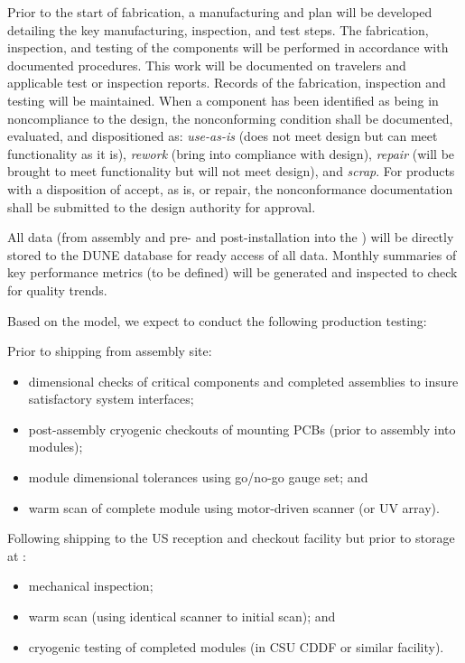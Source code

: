 
Prior to the start of fabrication, a manufacturing and  plan will be developed detailing the key manufacturing, inspection, and test steps.  The fabrication, inspection, and testing of the components will be performed in accordance with documented procedures. This work will be documented on travelers and applicable test or inspection reports. Records of the fabrication, inspection and testing will be maintained. When a component has been identified as being in noncompliance to the design, the nonconforming condition shall be documented, evaluated, and dispositioned as: {\it use-as-is} (does not meet design but can meet functionality as it is), {\it rework} (bring into compliance with design), {\it repair} (will be brought to meet functionality but will not meet design), and {\it scrap}. For products with a disposition of accept, as is, or repair, the nonconformance documentation shall be submitted to the design authority for approval.   

All  data  (from assembly and pre- and post-installation into the ) will be directly stored to the DUNE database for ready access of all  data.  Monthly summaries of key performance metrics (to be defined) will be generated and inspected to check for quality trends.

Based on the  model, we expect to conduct the following production testing:

Prior to shipping from assembly site:
\begin{itemize}
\item dimensional checks of critical components and completed assemblies to insure satisfactory system interfaces;
\item post-assembly cryogenic checkouts of  mounting PCBs (prior to assembly into  modules);
\item module dimensional tolerances using go/no-go gauge set; and
\item warm scan of complete module using motor-driven  scanner (or UV   array).
\end{itemize}

Following shipping to the US reception and checkout facility but prior to storage at :
\begin{itemize}
\item mechanical inspection;
\item warm scan (using identical scanner to initial scan); and
\item cryogenic testing of completed modules (in CSU CDDF or similar facility).
\end{itemize}

